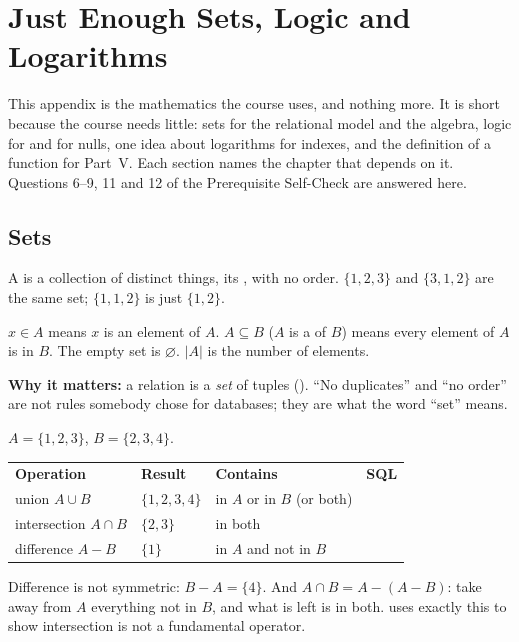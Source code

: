 \chapter{Just Enough Sets, Logic and Logarithms}\label{app:logic}
\normalfigures

This appendix is the mathematics the course uses, and nothing more. It is short
because the course needs little: sets for the relational model and the
algebra, logic for  and for nulls, one idea about logarithms for
indexes, and the definition of a function for Part~V. Each section names the
chapter that depends on it. Questions 6--9, 11 and 12 of the Prerequisite
Self-Check are answered here.

\section{Sets}

\begin{definitionbox}
A  is a collection of distinct things, its , with no
order. $\{1,2,3\}$ and $\{3,1,2\}$ are the same set; $\{1,1,2\}$ is just
$\{1,2\}$.

\smallskip
$x \in A$ means $x$ is an element of $A$. $A \subseteq B$ ($A$ is a
 of $B$) means every element of $A$ is in $B$. The empty set is
$\varnothing$. $|A|$ is the number of elements.

\smallskip
\textbf{Why it matters:} a relation is a \emph{set} of tuples
(). ``No duplicates'' and ``no order'' are not rules somebody
chose for databases; they are what the word ``set'' means.
\end{definitionbox}

\begin{examplebox}
$A = \{1,2,3\}$, $B = \{2,3,4\}$.

\medskip
\begin{tabular}{@{}L{3.6cm}L{3.0cm}L{4.8cm}L{2.4cm}@{}}
\textbf{Operation} & \textbf{Result} & \textbf{Contains} & \textbf{SQL} \\
union $A \cup B$ & $\{1,2,3,4\}$ & in $A$ or in $B$ (or both) &  \\
intersection $A \cap B$ & $\{2,3\}$ & in both &  \\
difference $A - B$ & $\{1\}$ & in $A$ and not in $B$ &  \\
\end{tabular}

\smallskip
Difference is not symmetric: $B - A = \{4\}$. And
$A \cap B = A - (A - B)$: take away from $A$ everything not in $B$, and what is
left is in both.  uses exactly this to show intersection is not
a fundamental operator.
\end{examplebox}

